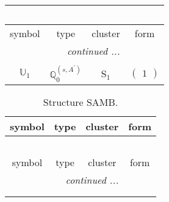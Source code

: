 \documentclass[fleqn,10pt,landscape]{article}
\begin{document}
\begin{itemize}
\begin{center}
\begin{longtable}{c|c|c|c}
\multicolumn{3}{l}{\tablename\ \thetable{}} \\
 \hline \hline
symbol & type & cluster & form \\ \hline \endhead

 \hline \hline
\multicolumn{3}{r}{\footnotesize\it continued ...} \\ \endfoot

 \hline \hline
\multicolumn{3}{r}{} \\ \endlastfoot

$ \mathbb{U}_{1} $ & $\mathbb{Q}_{0}^{(s,A^{\prime})}$ & S$_{1}$ & $\begin{pmatrix} 1 \end{pmatrix}$ \\
\end{longtable}
\end{center}
\begin{center}
\renewcommand{\arraystretch}{1.3}
\begin{longtable}{c|c|c|c}
\caption{Structure SAMB.}
 \\
 \hline \hline
symbol & type & cluster & form \\ \hline \endfirsthead

\multicolumn{3}{l}{\tablename\ \thetable{}} \\
 \hline \hline
symbol & type & cluster & form \\ \hline \endhead

 \hline \hline
\multicolumn{3}{r}{\footnotesize\it continued ...} \\ \endfoot

 \hline \hline
\multicolumn{3}{r}{} \\ \endlastfoot


\end{longtable}
\end{center}
\end{itemize}
\end{document}
